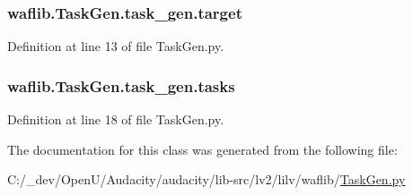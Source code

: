 \subsubsection[{\texorpdfstring{target}{target}}]{\setlength{\rightskip}{0pt plus 5cm}waflib.\+Task\+Gen.\+task\+\_\+gen.\+target}\hypertarget{classwaflib_1_1_task_gen_1_1task__gen_a0d78aaea7bb63815b6d48575c8543a0f}{}\label{classwaflib_1_1_task_gen_1_1task__gen_a0d78aaea7bb63815b6d48575c8543a0f}


Definition at line 13 of file Task\+Gen.\+py.

\subsubsection[{\texorpdfstring{tasks}{tasks}}]{\setlength{\rightskip}{0pt plus 5cm}waflib.\+Task\+Gen.\+task\+\_\+gen.\+tasks}\hypertarget{classwaflib_1_1_task_gen_1_1task__gen_abe1e9f4af2e65d6f168e38cf7725bd25}{}\label{classwaflib_1_1_task_gen_1_1task__gen_abe1e9f4af2e65d6f168e38cf7725bd25}


Definition at line 18 of file Task\+Gen.\+py.



The documentation for this class was generated from the following file\+:\begin{DoxyCompactItemize}
\item 
C\+:/\+\_\+dev/\+Open\+U/\+Audacity/audacity/lib-\/src/lv2/lilv/waflib/\hyperlink{lilv_2waflib_2_task_gen_8py}{Task\+Gen.\+py}\end{DoxyCompactItemize}
